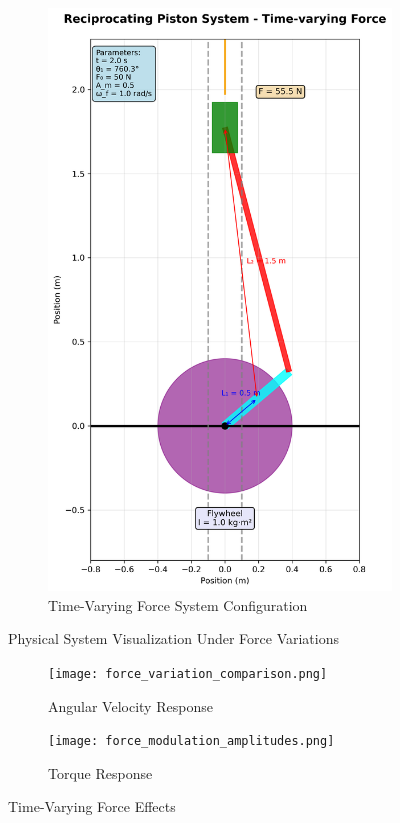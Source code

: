 \documentclass[10pt]{article}
\begin{document}
\begin{figure}[H]
\begin{subfigure}[b]{0.45\textwidth}
        \centering
        \includegraphics[width=\textwidth]{system_time_varying_force.png}
        \caption{Time-Varying Force System Configuration}
    \end{subfigure}
    \caption{Physical System Visualization Under Force Variations}
\end{figure}
\begin{figure}[H]
    \centering
    \begin{subfigure}[b]{0.48\textwidth}
        \centering
        \texttt{[image: force\_variation\_comparison.png]}
        \caption{Angular Velocity Response}
    \end{subfigure}
    \hfill
    \begin{subfigure}[b]{0.48\textwidth}
        \centering
        \texttt{[image: force\_modulation\_amplitudes.png]}
        \caption{Torque Response}
    \end{subfigure}
    \caption{Time-Varying Force Effects}
\end{figure}
\end{document}
